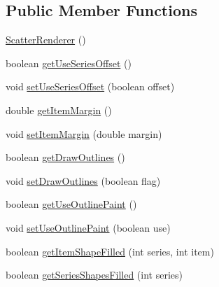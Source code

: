 \subsection*{Public Member Functions}
\begin{DoxyCompactItemize}
\item 
\mbox{\hyperlink{classorg_1_1jfree_1_1chart_1_1renderer_1_1category_1_1_scatter_renderer_a8ee11b4f57b59dc694e84773461bf434}{Scatter\+Renderer}} ()
\item 
boolean \mbox{\hyperlink{classorg_1_1jfree_1_1chart_1_1renderer_1_1category_1_1_scatter_renderer_a7ec61a84fcdf7910f9459b2e88261249}{get\+Use\+Series\+Offset}} ()
\item 
void \mbox{\hyperlink{classorg_1_1jfree_1_1chart_1_1renderer_1_1category_1_1_scatter_renderer_a0a2e10126057a8828d7c9e86270f2fbb}{set\+Use\+Series\+Offset}} (boolean offset)
\item 
double \mbox{\hyperlink{classorg_1_1jfree_1_1chart_1_1renderer_1_1category_1_1_scatter_renderer_a04492c88e6bffca4048e638d89d6ef6d}{get\+Item\+Margin}} ()
\item 
void \mbox{\hyperlink{classorg_1_1jfree_1_1chart_1_1renderer_1_1category_1_1_scatter_renderer_a4415e005084f4401c7386d6fec53301e}{set\+Item\+Margin}} (double margin)
\item 
boolean \mbox{\hyperlink{classorg_1_1jfree_1_1chart_1_1renderer_1_1category_1_1_scatter_renderer_a0dac1c7119c34fe923357e583f3267c4}{get\+Draw\+Outlines}} ()
\item 
void \mbox{\hyperlink{classorg_1_1jfree_1_1chart_1_1renderer_1_1category_1_1_scatter_renderer_a7abfe3403b5c744918c537dcf97dd09b}{set\+Draw\+Outlines}} (boolean flag)
\item 
boolean \mbox{\hyperlink{classorg_1_1jfree_1_1chart_1_1renderer_1_1category_1_1_scatter_renderer_a4aab32236d2b3e1ffc9e3165a2789500}{get\+Use\+Outline\+Paint}} ()
\item 
void \mbox{\hyperlink{classorg_1_1jfree_1_1chart_1_1renderer_1_1category_1_1_scatter_renderer_a12757d38eaca9521a3f7770a984cfc9b}{set\+Use\+Outline\+Paint}} (boolean use)
\item 
boolean \mbox{\hyperlink{classorg_1_1jfree_1_1chart_1_1renderer_1_1category_1_1_scatter_renderer_a18460cdd28e00185faf674a73267a23f}{get\+Item\+Shape\+Filled}} (int series, int item)
\item 
boolean \mbox{\hyperlink{classorg_1_1jfree_1_1chart_1_1renderer_1_1category_1_1_scatter_renderer_aa1ab3dcf420160e7ba3002a0e33c221c}{get\+Series\+Shapes\+Filled}} (int series)
\item 

\end{DoxyCompactItemize}
